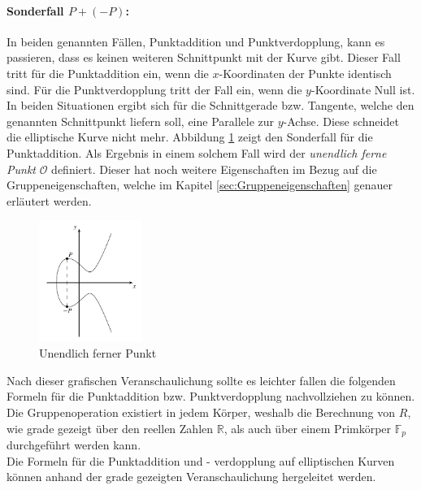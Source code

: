 \paragraph{Sonderfall $P + (-P)$:}
In beiden genannten Fällen, Punktaddition und Punktverdopplung, kann es passieren, dass es keinen weiteren Schnittpunkt mit der Kurve gibt. Dieser Fall tritt für die Punktaddition ein, wenn die $x$-Koordinaten der Punkte identisch sind. Für die Punktverdopplung tritt der Fall ein, wenn die $y$-Koordinate Null ist. In beiden Situationen ergibt sich für die Schnittgerade bzw. Tangente, welche den genannten Schnittpunkt liefern soll, eine Parallele zur $y$-Achse. Diese schneidet die elliptische Kurve nicht mehr. Abbildung \ref{fig:UnendlichFernerPunkt} zeigt den Sonderfall für die Punktaddition. Als Ergebnis in einem solchem Fall wird der \textit{unendlich ferne Punkt} $\mathcal{O}$ definiert. Dieser hat noch weitere Eigenschaften im Bezug auf die Gruppeneigenschaften, welche im Kapitel \ref{sec:Gruppeneigenschaften} genauer erläutert werden.

\begin{figure}[H]
    \centering
    \includegraphics[width=0.3\textwidth]{grafiken/UnendlichFernerPunkt.PNG}
    \caption{Unendlich ferner Punkt}
    \label{fig:UnendlichFernerPunkt}
\end{figure}

Nach dieser grafischen Veranschaulichung sollte es leichter fallen die folgenden Formeln für die Punktaddition bzw. Punktverdopplung nachvollziehen zu können. Die Gruppenoperation existiert in jedem Körper, weshalb die Berechnung von $R$, wie grade gezeigt über den reellen Zahlen $\mathbb{R}$, als auch über einem Primkörper $\mathbb{F}_p$ durchgeführt werden kann.\cite[276-280]{Paar.2016}\\

Die Formeln für die Punktaddition und - verdopplung auf elliptischen Kurven können anhand der grade gezeigten Veranschaulichung hergeleitet werden.\\ 

